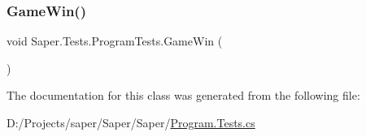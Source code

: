 \subsubsection{\texorpdfstring{GameWin()}{GameWin()}}
{\footnotesize\ttfamily void Saper.\+Tests.\+Program\+Tests.\+Game\+Win (\begin{DoxyParamCaption}{ }\end{DoxyParamCaption})}



The documentation for this class was generated from the following file\+:\begin{DoxyCompactItemize}
\item 
D\+:/\+Projects/saper/\+Saper/\+Saper/\mbox{\hyperlink{_program_8_tests_8cs}{Program.\+Tests.\+cs}}\end{DoxyCompactItemize}
